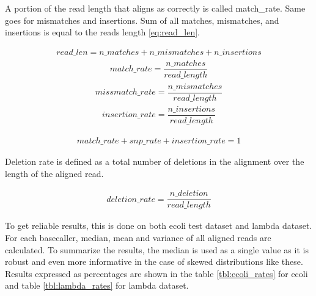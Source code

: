 \documentclass[times, utf8, diplomski, numeric, english]{fer}
\begin{document}
A portion of the read length that aligns as correctly is called match\_rate. Same goes for mismatches and insertions. 
Sum of all matches, mismatches, and insertions is equal to the reads length \ref{eq:read_len}. 

\begin{equation}
\begin{gathered}
\label{eq:read_len}
read\_len =  n\_matches + n\_mismatches + n\_insertions 
\end{gathered}
\end{equation}
\begin{equation}
\begin{gathered}
match\_rate = \dfrac{n\_matches}{read\_length}
\end{gathered}
\end{equation}
\begin{equation}
\begin{gathered}
missmatch\_rate = \dfrac{n\_mismatches}{read\_length}
\end{gathered}
\end{equation}
\begin{equation}
\begin{gathered}
insertion\_rate = \dfrac{n\_insertions}{read\_length}
\end{gathered}
\end{equation}

\begin{equation}
\begin{gathered}
match\_rate  + snp\_rate + insertion\_rate = 1
\end{gathered}
\end{equation}

Deletion rate is defined as a total number of deletions in the alignment over the length of the aligned read. 

\begin{equation}
\begin{gathered}
deletion\_rate = \dfrac{n\_deletion}{read\_length}
\end{gathered}
\end{equation}


To get reliable results, this is done on both ecoli test dataset and lambda dataset. 
For each basecaller, median, mean and variance of all aligned reads are calculated. To summarize the results, the median is used as a single value as it is robust and even more informative in the case of skewed distributions like these.  Results expressed as percentages are shown in the table \ref{tbl:ecoli_rates} for ecoli and table \ref{tbl:lambda_rates} for lambda dataset. 
\end{document}
